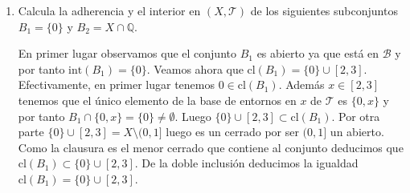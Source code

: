 \documentclass[12pt]{article}
\begin{document}
\begin{ejercicio}
\begin{enumerate}[label=\alph*)]
\begin{itemize}[leftmargin=*]
                    \item Supongamos que $B=(x-\epsilon,x+\epsilon)$ para $0<x<1$, $0<\epsilon\le \min\{x,1-x\}$ y $B'=(1-\lambda,1]$ para $0<\lambda\le 1$, $1-\lambda<x+\epsilon$. Entonces tenemos
                    \[
                    (x-\epsilon,x+\epsilon)\cap(1-\lambda,1]=(1-\lambda,x+\epsilon)=(m_3-\epsilon_1,m_3+\epsilon_1)\in\mathcal{B}
                    \]
                    donde $m_3=\frac{x+\epsilon+1-\lambda}{2}$ y $\epsilon_1=\frac{x+\epsilon-1+\lambda}{2}$.
                \end{itemize}
        
                En los dos últimos casos también podemos argumentar que $B\cap B'$ es un abierto de $\mathcal{T}_u$. Así si $z\in B\cap B'$, teniendo en cuenta que \allowbreak $\{(z-\epsilon,z+\epsilon) \mid \epsilon>0\}$ es una base de entornos en $z$ de $\mathcal{T}_u$ podemos encontrar un $\epsilon>0$ suficientemente pequeño para $(z-\epsilon,z+\epsilon)\subset B\cap B'$.
        
                Finalmente, observemos que para los puntos en $(0,1]$, los elementos de $\mathcal{B}$ coinciden con una base de $\mathcal{T}_u|_{(0,1]}$. Por tanto, las bases de entornos en $x\in(0,1]$ para $\mathcal{T}_u|_{(0,1]}$ son bases de entornos en esos puntos para la topología $\mathcal{T}$. Se tienen entonces las siguientes bases de entornos para un punto $x\in X$ de la topología $\mathcal{T}$:
                \begin{align*}
                \mathcal{B}_0&=\{\{0\}\},\\
                \mathcal{B}_x&=\{(x-\epsilon,x+\epsilon) \mid 0<\epsilon\le \min\{x,1-x\}\} \quad \text{si } x\in(0,1),\\
                \mathcal{B}_1&=\{(1-\epsilon,1] \mid 0<\epsilon\le 1\},\\
                \mathcal{B}_x&=\{\{0,x\}\} \quad \text{si } x\in[2,3].
                \end{align*}
        
            \item Calcula la adherencia y el interior en $(X, \mathcal{T})$ de los siguientes subconjuntos $B_1 = \{0\}$ y $B_2 = X \cap \mathbb{Q}$.

                En primer lugar observamos que el conjunto $B_1$ es abierto ya que está en $\mathcal{B}$ y por tanto $\text{int}(B_1)=\{0\}$. Veamos ahora que $\text{cl}(B_1)=\{0\}\cup[2,3]$. Efectivamente, en primer lugar tenemos $0\in \text{cl}(B_1)$. Además $x\in[2,3]$ tenemos que el único elemento de la base de entornos en $x$ de $\mathcal{T}$ es $\{0,x\}$ y por tanto $B_1\cap\{0,x\}=\{0\}\ne\emptyset$. Luego $\{0\}\cup[2,3]\subset \text{cl}(B_1)$. Por otra parte $\{0\}\cup[2,3]=X\setminus(0,1]$ luego es un cerrado por ser $(0,1]$ un abierto. Como la clausura es el menor cerrado que contiene al conjunto deducimos que $\text{cl}(B_1)\subset\{0\}\cup[2,3]$. De la doble inclusión deducimos la igualdad $\text{cl}(B_1)=\{0\}\cup[2,3]$.


\end{enumerate}
\end{ejercicio}
\end{document}
